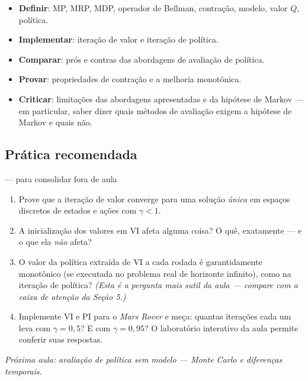 \documentclass[11pt, a4paper]{article}
\begin{document}
\begin{itemize}
  \item \textbf{Definir}: MP, MRP, MDP, operador de Bellman, contração, modelo, valor
        $Q$, política.
  \item \textbf{Implementar}: iteração de valor e iteração de política.
  \item \textbf{Comparar}: prós e contras das abordagens de avaliação de política.
  \item \textbf{Provar}: propriedades de contração e a melhoria monotônica.
  \item \textbf{Criticar}: limitações das abordagens apresentadas e da hipótese de
        Markov --- em particular, saber dizer quais métodos de avaliação exigem a
        hipótese de Markov e quais não.
\end{itemize}

\subsection{Prática recomendada}

\begin{exbox}{--- para consolidar fora de aula}
\begin{enumerate}
  \item Prove que a iteração de valor converge para uma solução \emph{única} em espaços
        discretos de estados e ações com $\gamma < 1$.
  \item A inicialização dos valores em VI afeta alguma coisa? O quê, exatamente --- e o
        que ela \emph{não} afeta?
  \item O valor da política extraída de VI a cada rodada é garantidamente monotônico
        (se executada no problema real de horizonte infinito), como na iteração de
        política? \emph{(Esta é a pergunta mais sutil da aula --- compare com a caixa
        de atenção da Seção 5.)}
  \item Implemente VI e PI para o \emph{Mars Rover} e meça: quantas iterações cada um
        leva com $\gamma = 0{,}5$? E com $\gamma = 0{,}95$? O laboratório interativo da
        aula permite conferir suas respostas.
\end{enumerate}
\end{exbox}

\vspace{1em}
\begin{center}
{\color{rlCinza}\small\itshape Próxima aula: avaliação de política sem modelo ---
Monte Carlo e diferenças temporais.}
\end{center}
\end{document}
